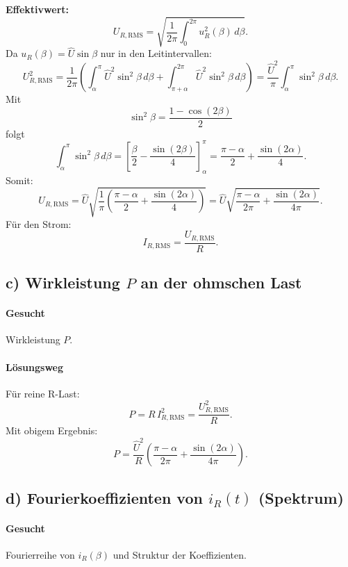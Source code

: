\textbf{Effektivwert:}
\[
U_{R,\mathrm{RMS}}=\sqrt{\frac{1}{2\pi}\int_0^{2\pi}u_R^2(\beta)\,d\beta}.
\]
Da $u_R(\beta)=\hat U\sin\beta$ nur in den Leitintervallen:
\[
U_{R,\mathrm{RMS}}^2=\frac{1}{2\pi}\left(
\int_{\alpha}^{\pi}\hat U^2\sin^2\beta\,d\beta
+
\int_{\pi+\alpha}^{2\pi}\hat U^2\sin^2\beta\,d\beta
\right)
=\frac{\hat U^2}{\pi}\int_{\alpha}^{\pi}\sin^2\beta\,d\beta.
\]
Mit
\[
\sin^2\beta=\frac{1-\cos(2\beta)}{2}
\]
folgt
\[
\int_{\alpha}^{\pi}\sin^2\beta\,d\beta
=
\left[\frac{\beta}{2}-\frac{\sin(2\beta)}{4}\right]_{\alpha}^{\pi}
=
\frac{\pi-\alpha}{2}+\frac{\sin(2\alpha)}{4}.
\]
Somit:
\[
\boxed{
U_{R,\mathrm{RMS}}
=
\hat U \sqrt{\frac{1}{\pi}\left(\frac{\pi-\alpha}{2}+\frac{\sin(2\alpha)}{4}\right)}
=
\hat U\sqrt{\frac{\pi-\alpha}{2\pi}+\frac{\sin(2\alpha)}{4\pi}}
}.
\]
Für den Strom:
\[
\boxed{I_{R,\mathrm{RMS}}=\frac{U_{R,\mathrm{RMS}}}{R}}.
\]


\subsection*{c) Wirkleistung $P$ an der ohmschen Last}

\paragraph{Gesucht}
Wirkleistung $P$.

\paragraph{Lösungsweg}
Für reine R-Last:
\[
P = R\, I_{R,\mathrm{RMS}}^2=\frac{U_{R,\mathrm{RMS}}^2}{R}.
\]
Mit obigem Ergebnis:
\[
\boxed{
P
=
\frac{\hat U^2}{R}
\left(
\frac{\pi-\alpha}{2\pi}+\frac{\sin(2\alpha)}{4\pi}
\right)
}.
\]


\subsection*{d) Fourierkoeffizienten von $i_R(t)$ (Spektrum)}

\paragraph{Gesucht}
Fourierreihe von $i_R(\beta)$ und Struktur der Koeffizienten.

